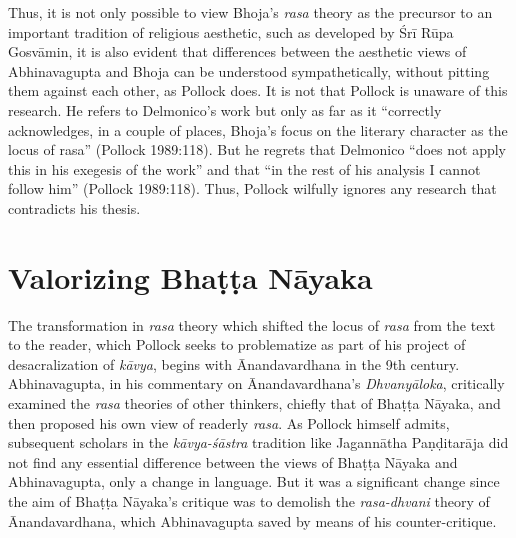 Thus, it is not only possible to view Bhoja's {\sl rasa} theory as the precursor to an important tradition of religious aesthetic, such as developed by Śrī Rūpa Gosvāmin, it is also evident that differences between the aesthetic views of Abhinavagupta and Bhoja can be understood sympathetically, without pitting them against each other, as Pollock does. It is not that Pollock is unaware of this research. He refers to Delmonico's work but only as far as it ``correctly acknowledges, in a couple of places, Bhoja's focus on the literary character as the locus of rasa'' (Pollock 1989:118). But he regrets that Delmonico ``does not apply this in his exegesis of the work'' and that ``in the rest of his analysis I cannot follow him'' (Pollock 1989:118). Thus, Pollock wilfully ignores any research that contradicts his thesis.

\section*{Valorizing Bhaṭṭa Nāyaka}

The transformation in {\sl rasa} theory which shifted the locus of {\sl rasa} from the text to the reader, which Pollock seeks to problematize as part of his project of desacralization of {\sl kāvya}, begins with Ānandavardhana in the 9th century. Abhinavagupta, in his commentary on Ānandavardhana's {\sl Dhvanyāloka}, critically examined the {\sl rasa} theories of other thinkers, chiefly that of Bhaṭṭa Nāyaka, and then proposed his own view of readerly {\sl rasa}. As Pollock himself admits, subsequent scholars in the {\sl kāvya-śāstra} tradition like Jagannātha Paṇḍitarāja did not find any essential difference between the views of Bhaṭṭa Nāyaka and Abhinavagupta, only a change in language. But it was a significant change since the aim of Bhaṭṭa Nāyaka's critique was to demolish the {\sl rasa-dhvani} theory of Ānandavardhana, which Abhinavagupta saved by means of his counter-critique. 

